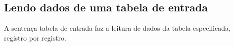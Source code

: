 \documentclass[11pt, brazil]{report}
\begin{document}
%
%
%

\subsection{Lendo dados de uma tabela de entrada}

A sentença tabela de entrada faz a leitura de dados
da tabela especificada, registro por registro.
\end{document}
